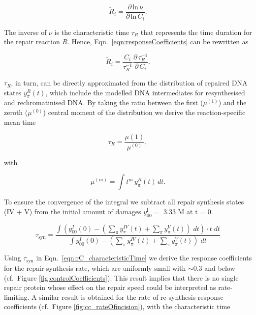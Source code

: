 \begin{equation}
\tilde{R}_i = \frac{\partial \, \text{ln} \, \nu}{\partial \, \text{ln} \, C_i}.
\label{eqn:responseCoefficients}
\end{equation}

The inverse of $\nu$ is the characteristic time $\tau_R$ that represents the time duration for the repair reaction $R$. Hence, Eqn.\ \ref{eqn:responseCoefficients} can be rewritten as

\begin{equation}
\tilde{R}_i = \frac{C_i}{\tau_R^{-1}} \frac{\partial  \, \tau_R^{-1}}{\partial \,  C_i}.
\label{eqn:rC_characteristicTime}   
\end{equation}

$\tau_R$, in turn, can be directly approximated from the distribution of repaired DNA states $y^R_\pi(t)$, which include the modelled DNA intermediates for resynthesised and rechromatinised DNA. By taking the ratio between the first ($\mu^{(1)}$) and the zeroth ($\mu^{(0)}$) central moment of the distribution we derive the reaction-specific mean time 

\begin{equation}
\tau_{R} = \frac{\mu{(1)}}{\mu^{(0)}}, 
\label{eqn:meanreactiontime}   
\end{equation}

with

\begin{equation}
\mu^{(m)} = \int t^m \, y^R_\pi(t)\, dt.
\label{eqn:moments}   
\end{equation}


To ensure the convergence of the integral we subtract all repair synthesis states (IV + V) from the initial amount of damages $y^{\text{I}}_{00} = $ 3.33 \textmu M at t = 0.

\begin{equation}	
\tau_{\text{syn}}=\frac{\int (y^I_{00}(0)-( \sum_ \pi  y_\pi^{IV}(t)+\sum_ \pi  y_\pi^{V}(t))\; dt)\cdot t\; dt}{\int y^I_{00}(0)-( \sum_ \pi  y_\pi^{IV}(t)+\sum_ \pi  y_\pi^{V}(t))\; dt}
\end{equation}

Using $\tau_{\text{syn}}$ in Eqn.\ \ref{eqn:rC_characteristicTime} we derive the response coefficients for the repair synthesis rate, which are uniformly small with $\sim$0.3 and below (cf.\ Figure \ref{fig:controlCoefficients}). This result implies that there is no single repair protein whose effect on the repair speed could be interpreted as rate-limiting. A similar result is obtained for the rate of re-synthesis response coefficients (cf.\ Figure \ref{fig:cc_rateOfincision}), with the characteristic time

